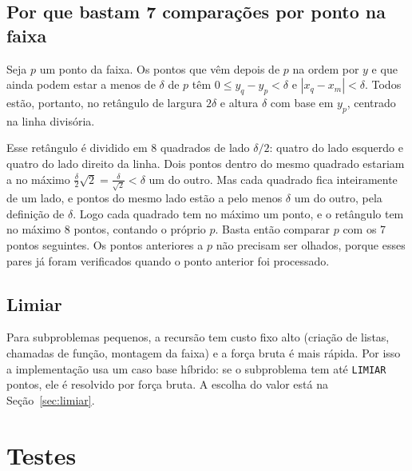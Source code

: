 \documentclass[11pt,a4paper]{article}
\begin{document}
\subsection{Por que bastam 7 comparações por ponto na faixa}
Seja $p$ um ponto da faixa. Os pontos que vêm depois de $p$ na ordem por $y$ e
que ainda podem estar a menos de $\delta$ de $p$ têm $0 \le y_q - y_p < \delta$
e $|x_q - x_m| < \delta$. Todos estão, portanto, no retângulo de largura
$2\delta$ e altura $\delta$ com base em $y_p$, centrado na linha divisória.

Esse retângulo é dividido em 8 quadrados de lado $\delta/2$: quatro do lado
esquerdo e quatro do lado direito da linha. Dois pontos dentro do mesmo
quadrado estariam a no máximo $\frac{\delta}{2}\sqrt{2} = \frac{\delta}{\sqrt2} < \delta$
um do outro. Mas cada quadrado fica inteiramente de um lado, e pontos do
mesmo lado estão a pelo menos $\delta$ um do outro, pela definição de $\delta$.
Logo cada quadrado tem no máximo um ponto, e o retângulo tem no máximo 8
pontos, contando o próprio $p$. Basta então comparar $p$ com os 7 pontos
seguintes. Os pontos anteriores a $p$ não precisam ser olhados, porque esses
pares já foram verificados quando o ponto anterior foi processado.

\subsection{Limiar}
Para subproblemas pequenos, a recursão tem custo fixo alto (criação de listas,
chamadas de função, montagem da faixa) e a força bruta é mais rápida. Por isso
a implementação usa um caso base híbrido: se o subproblema tem até
\texttt{LIMIAR} pontos, ele é resolvido por força bruta. A escolha do valor está
na Seção~\ref{sec:limiar}.

\section{Testes}
\end{document}
